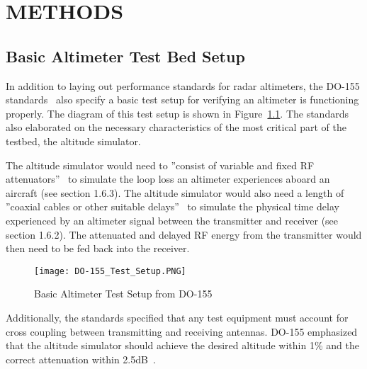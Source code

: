 %
%
%
%



\chapter{METHODS}
\section{Basic Altimeter Test Bed Setup}
In addition to laying out performance standards for radar altimeters, the DO-155 standards~\cite{noauthor_minimum_1974} also specify a basic test setup for verifying an altimeter is functioning properly. The diagram of this test setup is shown in Figure~\ref{fig:Basic Testbed}. The standards also elaborated on the necessary characteristics of the most critical part of the testbed, the altitude simulator. 

The altitude simulator would need to ''consist of variable and fixed RF attenuators''~\cite{noauthor_minimum_1974}  to simulate the loop loss an altimeter experiences aboard an aircraft (see section 1.6.3). The altitude simulator would also need a length of ''coaxial cables or other suitable delays''~\cite{noauthor_minimum_1974}  to simulate the physical time delay experienced by an altimeter signal between the transmitter and receiver (see section 1.6.2). The attenuated and delayed RF energy from the transmitter would then need to be fed back into the receiver. 
\begin{figure}[ht]
\centering
\texttt{[image: DO-155\_Test\_Setup.PNG]}
\caption[]{Basic Altimeter Test Setup from DO-155~\cite{noauthor_minimum_1974}}

\label{fig:Basic Testbed}

\end{figure}
Additionally, the standards specified that any test equipment must account for cross coupling between transmitting and receiving antennas. DO-155 emphasized that the altitude simulator should achieve the desired altitude within 1\% and the correct attenuation within 2.5dB~\cite{noauthor_minimum_1974}.

